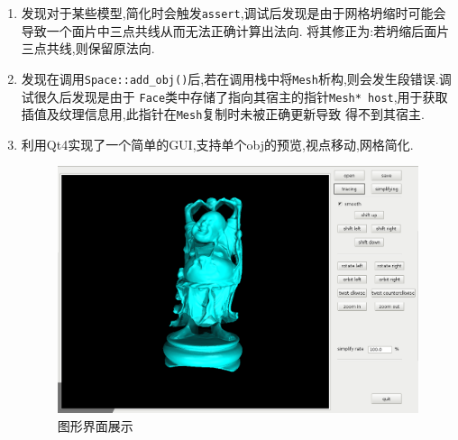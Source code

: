 \begin{enumerate}
\begin{figure}[H]
    \end{figure}

  \item 发现对于某些模型,简化时会触发\verb|assert|,调试后发现是由于网格坍缩时可能会导致一个面片中三点共线从而无法正确计算出法向.
    将其修正为:若坍缩后面片三点共线,则保留原法向.

  \item 发现在调用\verb|Space::add_obj()|后,若在调用栈中将\verb|Mesh|析构,则会发生段错误.调试很久后发现是由于
    \verb|Face|类中存储了指向其宿主的指针\verb|Mesh* host|,用于获取插值及纹理信息用,此指针在\verb|Mesh|复制时未被正确更新导致
    得不到其宿主.


  \item 利用Qt4实现了一个简单的GUI,支持单个obj的预览,视点移动,网格简化.

    \begin{figure}[H]
      \centering
      \includegraphics[scale=0.38]{img/gui.png}
      \caption{图形界面展示\label{fig:gui}}
    \end{figure}


\end{enumerate}
